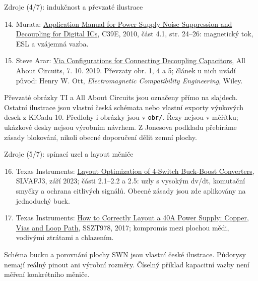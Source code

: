 \documentclass{beamer}
\begin{document}
\begin{frame}[t]{Zdroje (4/7): indukčnost a převzaté ilustrace}
	\footnotesize
	\begin{enumerate}
		\setcounter{enumi}{13}
		\item Murata: \href{https://e2e.ti.com/cfs-file/__key/communityserver-discussions-components-files/14/c39e.pdf}{Application Manual for Power Supply Noise Suppression and Decoupling for Digital ICs}, C39E, 2010, část 4.1, str. 24--26: magnetický tok, ESL a vzájemná vazba.
		\item Steve Arar: \href{https://www.allaboutcircuits.com/technical-articles/different-via-configurations-for-connecting-decoupling-capacitors/}{Via Configurations for Connecting Decoupling Capacitors}, All About Circuits, 7. 10. 2019. Převzaty obr. 1, 4 a 5; článek u nich uvádí původ: Henry W. Ott, \textit{Electromagnetic Compatibility Engineering}, Wiley.
	\end{enumerate}
	\medskip
	{\scriptsize Převzaté obrázky TI a All About Circuits jsou označeny přímo na slajdech. Ostatní ilustrace jsou vlastní česká schémata nebo vlastní exporty výukových desek z KiCadu 10. Předlohy i obrázky jsou v \texttt{obr/}. Řezy nejsou v měřítku; ukázkové desky nejsou výrobním návrhem. Z Jonesova podkladu přebíráme zásady blokování, nikoli obecné doporučení dělit zemní plochy.}
\end{frame}


\begin{frame}[t]{Zdroje (5/7): spínací uzel a layout měniče}
	\small
	\begin{enumerate}
		\setcounter{enumi}{15}
		\item Texas Instruments: \href{https://www.ti.com/lit/an/slvafj3/slvafj3.pdf}{Layout Optimization of 4-Switch Buck-Boost Converters}, SLVAFJ3, září 2023; části 2.1--2.2 a 2.5: uzly s vysokým dv/dt, komutační smyčky a ochrana citlivých signálů. Obecné zásady jsou zde aplikovány na jednoduchý buck.
		\item Texas Instruments: \href{https://www.ti.com/document-viewer/lit/html/SSZT978/GUID-8C25D4C0-B783-4E3A-9E0C-8DE1DFBC7851}{How to Correctly Layout a 40A Power Supply: Copper, Vias and Loop Path}, SSZT978, 2017; kompromis mezi plochou mědi, vodivými ztrátami a chlazením.
	\end{enumerate}
	\medskip
	{\scriptsize Schéma bucku a porovnání plochy SWN jsou vlastní české ilustrace. Půdorysy nemají reálný pinout ani výrobní rozměry. Číselný příklad kapacitní vazby není měření konkrétního měniče.}
\end{frame}
\end{document}
